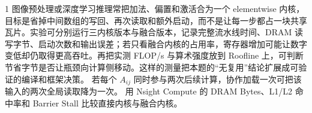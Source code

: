 \begin{solutionexercise}{1}
图像预处理或深度学习推理常把加法、偏置和激活合为一个 elementwise 内核，目标是省掉中间数组的写回、再次读取和额外启动，而不是让每一步都占一块共享瓦片。实验可分别运行三内核版本与融合版本，记录完整流水线时间、DRAM 读写字节、启动次数和输出误差；若只看融合内核的占用率，寄存器增加可能让数字变低却仍取得更高吞吐。再把实测 FLOP/s 与算术强度放到 Roofline 上，可判断节省字节是否让瓶颈向计算侧移动。这样的测量把本题的“无复用”结论扩展成可验证的编译和框架决策。
\variantheading 若每个 $A_{ij}$ 同时参与两次后续计算，协作加载一次可把该输入的两次全局读取降为一次。
\practiceheading 用 Nsight Compute 的 DRAM Bytes、L1/L2 命中率和 Barrier Stall 比较直接内核与融合内核。
\end{solutionexercise}

